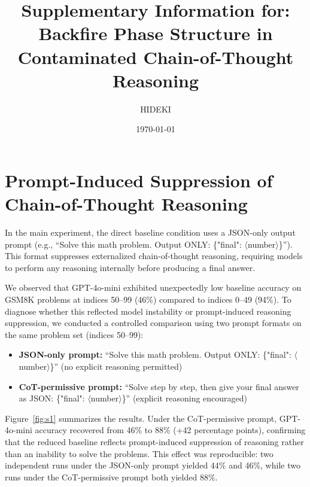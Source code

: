 \documentclass[aps,prx,reprint,twocolumn,superscriptaddress]{revtex4-2}
\begin{document}
\title{Supplementary Information for:\\Backfire Phase Structure in Contaminated Chain-of-Thought Reasoning}

\author{HIDEKI}

\date{\today}

\maketitle


\section{Prompt-Induced Suppression of Chain-of-Thought Reasoning}

In the main experiment, the direct baseline condition uses a JSON-only output prompt (e.g., ``Solve this math problem. Output ONLY: \{"final": $\langle$number$\rangle$\}''). This format suppresses externalized chain-of-thought reasoning, requiring models to perform any reasoning internally before producing a final answer.

We observed that GPT-4o-mini exhibited unexpectedly low baseline accuracy on GSM8K problems at indices 50--99 (46\%) compared to indices 0--49 (94\%). To diagnose whether this reflected model instability or prompt-induced reasoning suppression, we conducted a controlled comparison using two prompt formats on the same problem set (indices 50--99):

\begin{itemize}
\item \textbf{JSON-only prompt:} ``Solve this math problem. Output ONLY: \{"final": $\langle$number$\rangle$\}'' (no explicit reasoning permitted)
\item \textbf{CoT-permissive prompt:} ``Solve step by step, then give your final answer as JSON: \{"final": $\langle$number$\rangle$\}'' (explicit reasoning encouraged)
\end{itemize}

Figure~\ref{fig:s1} summarizes the results. Under the CoT-permissive prompt, GPT-4o-mini accuracy recovered from 46\% to 88\% (+42 percentage points), confirming that the reduced baseline reflects prompt-induced suppression of reasoning rather than an inability to solve the problems. This effect was reproducible: two independent runs under the JSON-only prompt yielded 44\% and 46\%, while two runs under the CoT-permissive prompt both yielded 88\%.
\end{document}
